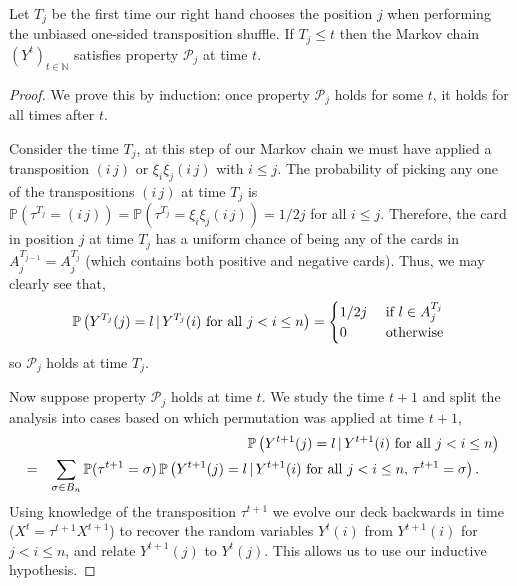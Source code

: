 \documentclass[11pt]{report}
\begin{document}
\begin{lemma}
	\label{chpt6:lem:SUTpropj}
	Let $T_{j}$ be the first time our right hand chooses the position
	$j$ when performing the unbiased one-sided transposition shuffle. 
	If $T_{j} \leq t$ then the Markov chain $(Y^{t})_{t\in \mathbb{N}}$ satisfies property $\mathcal{P}_{j}$ at time $t$.
\end{lemma}
\begin{proof}
	We prove this by induction: once property $\mathcal{P}_{j}$ holds for some $t$, it holds for all times after $t$. 
	
	
	Consider the time $T_{j}$, at this step of our Markov chain we must have applied  a transposition 
	$(i\,j)$ or $\xi_{i}\xi_{j}(i\, j)$ with $i\leq j$. The probability of picking any one of the transpositions $(i \,j)$ at time $T_{j}$ is $\mathbb{P}(\tau^{T_{j}} = (i\,j)) = \mathbb{P}(\tau^{T_{j}} = \xi_{i} \xi_{j}(i\,j))= 1/2j$ for all $i\leq j$. Therefore, the card in position $j$ at time $T_{j}$ has a uniform chance of being any of the cards in $A_{j}^{T_{j-1}} = A_{j}^{T_{j}}$ (which contains both positive and negative cards). Thus, we may clearly see that,
	\begin{eqnarray}
	\mathbb{P}\left(Y^{T_{j}} (j) = l \, | \, Y^{T_{j}}(i) \textnormal{ for all } j < i \leq n \right)= 
	\begin{cases}
	1/2j & \textnormal{ if } l \in A_{j}^{T_{j}}\\
	0 & \textnormal{ otherwise } 
	\end{cases}
	\end{eqnarray} 
	so $\mathcal{P}_{j}$ holds at time $T_{j}$.
	
	
	Now suppose property $\mathcal{P}_{j}$ holds at time $t$. We study the time $t+1$ and split the analysis into cases based on which permutation was applied at time $t+1$,
	\begin{eqnarray}
	& & \mathbb{P}\left(Y^{t+1}(j) =  l \, | \, Y^{t+1}(i) \textnormal{ for all } j < i \leq n\right) \nonumber\\
	& = &
	\sum_{\sigma \in B_{n}} \mathbb{P}(\tau^{t+1} = 
	\sigma) \, \mathbb{P}\left(Y^{t+1} (j) 
	= l \, | \, Y^{t+1}(i) \textnormal{ for all } j < i \leq n, \, \tau^{t+1} = \sigma 
	\right).\hspace{0.5cm}\label{chpt6:eqn:SSTinduction} 
	\end{eqnarray}
	Using knowledge of the transposition $\tau^{t+1}$ we evolve our deck backwards in time ($X^{t} = \tau^{t+1} X^{t+1}$) to recover the random variables $Y^{t}(i)$ from $Y^{t+1}(i)$ for $j < i \leq n$, and relate $Y^{t+1}(j)$ to $Y^{t}(j)$. This allows us to use our inductive hypothesis.
	

\end{proof}
\end{document}
